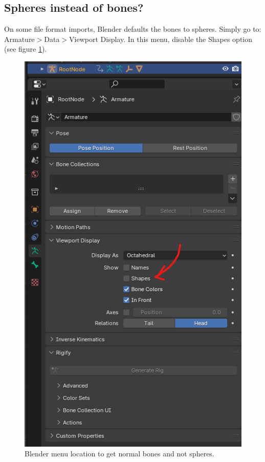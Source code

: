\documentclass{uva-inf-article}
\begin{document}
\subsection{Spheres instead of bones?}
On some file format imports, Blender defaults the bones to spheres. Simply go to: Armature$>$Data$>$Viewport Display. In this menu, disable the Shapes option (see figure \ref{fig:boneSpheres}).
\begin{figure}[hbt!]
    \centering
    \includegraphics[height=0.5\textheight]{imgs/boneSpheres.png}
    \caption{Blender menu location to get normal bones and not spheres.}
    \label{fig:boneSpheres}
\end{figure}
\end{document}
